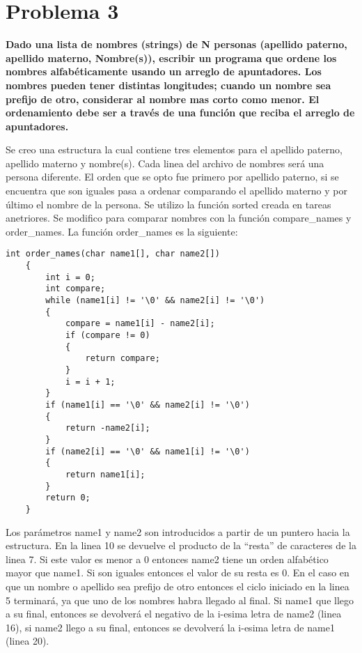 \section*{Problema 3}

\textbf{Dado una lista de nombres (strings) de N personas (apellido paterno, apellido materno, Nombre(s)), escribir un programa que ordene los nombres alfabéticamente usando un arreglo de apuntadores. Los nombres pueden tener distintas longitudes; cuando un nombre sea prefijo de otro, considerar al nombre mas corto como menor. El ordenamiento debe ser a través de una función que reciba el arreglo de apuntadores.}

Se creo una estructura la cual contiene tres elementos para el apellido paterno, apellido materno y nombre(s). Cada linea del archivo de nombres será una persona diferente. El orden que se opto fue primero por apellido paterno, si se encuentra que son iguales pasa a ordenar comparando el apellido materno y por último el nombre de la persona. Se utilizo la función \textcolor{title}{sorted} creada en tareas anetriores. Se modifico para comparar nombres con la función \textcolor{title}{compare\_names} y \textcolor{title}{order\_names}. La función \textcolor{title}{order\_names} es la siguiente:

\begin{lstlisting}[style=CStyle]
    int order_names(char name1[], char name2[])
    {
        int i = 0;
        int compare;
        while (name1[i] != '\0' && name2[i] != '\0')
        {
            compare = name1[i] - name2[i];
            if (compare != 0)
            {
                return compare;
            }
            i = i + 1;
        }
        if (name1[i] == '\0' && name2[i] != '\0')
        {
            return -name2[i];
        }
        if (name2[i] == '\0' && name1[i] != '\0')
        {
            return name1[i];
        }
        return 0;
    }
\end{lstlisting}

Los parámetros name1 y name2 son introducidos a partir de un puntero hacia la estructura. En la linea 10 se devuelve el producto de la ``resta'' de caracteres de la linea 7. Si este valor es menor a 0 entonces name2 tiene un orden alfabético mayor que name1. Si son iguales entonces el valor de su resta es 0. En el caso en que un nombre o apellido sea prefijo de otro entonces el ciclo iniciado en la linea 5 terminará, ya que uno de los nombres habra llegado al final. Si name1 que llego a su final, entonces se devolverá el negativo de la i-esima letra de name2 (linea 16), si name2 llego a su final, entonces se devolverá la i-esima letra de name1 (linea 20).

